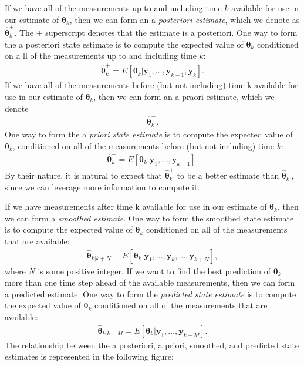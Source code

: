 If we have all of the measurements up to and including time $k$ available for use in our estimate of $\boldsymbol{\theta}_k$, then we can form an a \textit{posteriori estimate}, which we denote as $\hat{\boldsymbol{\theta}}_{k}^{+}.$ The $+$ superscript denotes that the estimate is a posteriori. One way to form the a posteriori state estimate is to compute the expected value of $\boldsymbol{\theta}_k$ conditioned on a ll of the measurements up to and including time $k$:
\begin{align*}
	\hat{\boldsymbol{\theta}}_{k}^{+} = E[\boldsymbol{\theta}_k|\mathbf{y}_{1},\dots, \mathbf{y}_{k-1},\mathbf{y}_{k}].
\end{align*}
If we have all of the measurements before (but not including) time k available for use in our estimate of $\boldsymbol{\theta}_k$, then we can form an a praori estimate, which we denote 
\begin{align*}
	\hat{\boldsymbol{\theta}}_{k}^{-}.
\end{align*}
One way to form the a \textit{priori state estimate} is to compute the expected value of $\boldsymbol{\theta}_k$, conditioned on all of the measurements before (but not including) time $k$:
\begin{align*}
	\hat{\boldsymbol{\theta}}_{k}^{-} = E[\boldsymbol{\theta}_k|\mathbf{y}_{1},\dots, \mathbf{y}_{k-1}].
\end{align*}
By their nature, it is natural to expect that $\hat{\boldsymbol{\theta}}_{k}^{+}$ to be a better estimate than $\hat{\boldsymbol{\theta}}_{k}^{-}$, since we can leverage more information to compute it. 

If we have measurements after time k available for use in our estimate of $\boldsymbol{\theta}_k$, then we can form a \textit{smoothed estimate}. One way to form the smoothed state estimate is to compute the expected value of $\boldsymbol{\theta}_k$ conditioned on all of the measurements that are available: 
\begin{align*}
	\hat{\boldsymbol{\theta}}_{k|k+N} = E[\boldsymbol{\theta}_k|\mathbf{y}_{1},\dots, \mathbf{y}_{k}, \dots, \mathbf{y}_{k+N}],
\end{align*}
where $N$ is some positive integer. If we want to find the best prediction of $\boldsymbol{\theta}_k$  more than one time step ahead of the available measurements, then we can form a predicted estimate. One way to form the \textit{predicted state estimate} is to compute the expected value of $\boldsymbol{\theta}_k$ conditioned on all of the measurements that are available: 
\begin{align*}
	\hat{\boldsymbol{\theta}}_{k|k-M} = E[\boldsymbol{\theta}_k|\mathbf{y}_{1},\dots, \mathbf{y}_{k-M}].
\end{align*}
The relationship between the a posteriori, a priori, smoothed, and predicted state estimates is represented in the following figure:















